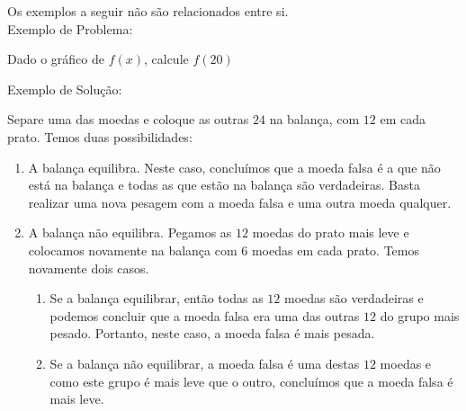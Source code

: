 \documentclass[12pt]{article}
\begin{document}
\pagestyle{empty}

Os exemplos a seguir não são relacionados entre si.
\\

Exemplo de Problema:
\begin{prob}
    Dado o gráfico de $f\left( x\right)$, calcule $f\left( 20\right)$


\end{prob}


Exemplo de Solução:
\begin{solu}
    Separe uma das moedas e coloque as outras $24$ na balança, com $12$ em cada prato. Temos duas possibilidades:
    \begin{enumerate}[(1)]
        \item
            A balança equilibra. Neste caso, concluímos que a moeda falsa é a que não está na balança e todas as que estão na balança são verdadeiras. Basta realizar uma nova pesagem com a moeda falsa e uma outra moeda qualquer.
        \item
            A balança não equilibra. Pegamos as $12$ moedas do prato mais leve e colocamos novamente na balança com $6$ moedas em cada prato. Temos novamente dois casos.
        \begin{enumerate}
            \item
                Se a balança equilibrar, então todas as $12$ moedas são verdadeiras e podemos  concluir que a moeda falsa era uma das outras $12$ do grupo mais pesado. Portanto, neste caso, a moeda  falsa é mais pesada.
            \item
                Se a balança não equilibrar, a moeda falsa é uma destas $12$ moedas e como este grupo é mais leve que o outro, concluímos que a moeda falsa é mais leve.
        \end{enumerate}
    \end{enumerate}
\end{solu}
\end{document}

